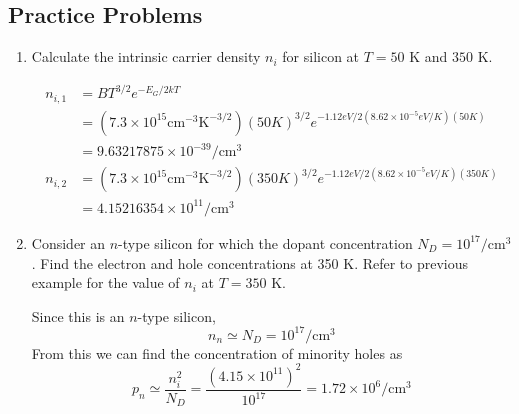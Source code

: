 \subsection{Practice Problems}
    \begin{enumerate}
        \item Calculate the intrinsic carrier density $n_i$ for silicon at $T = 50$ K and $350$ K.
        \begin{Ans}
            \begin{align*}
                n_{i,1} &= BT^{3/2} e^{-E_G / 2kT} \\
                &= (7.3 \times 10^{15} \text{cm}^{-3} \text{K}^{-3/2})(50 K)^{3/2} e^{-1.12 eV / 2(8.62 \times 10^{-5} eV/K)(50 K)} \\
                &= 9.63217875 \times 10^{-39} / \text{cm}^3 \\
                n_{i,2} &= (7.3 \times 10^{15} \text{cm}^{-3} \text{K}^{-3/2})(350 K)^{3/2} e^{-1.12 eV / 2(8.62 \times 10^{-5} eV/K)(350 K)} \\
                &= 4.15216354 \times 10^{11} / \text{cm}^3
            \end{align*}
        \end{Ans}

        \item Consider an $n$-type silicon for which the dopant concentration $N_D = 10^{17}/\text{cm}^3$. Find the electron and hole concentrations at 350 K. Refer to previous example for the value of $n_i$ at $T = 350$ K.
        \begin{Ans}
            Since this is an $n$-type silicon, 
                \[n_n \simeq N_D = 10^{17} /\text{cm}^3\]
            From this we can find the concentration of minority holes as 
                \[p_n \simeq \frac{n_i^2}{N_D} = \frac{(4.15 \times 10^{11})^2}{10^17} = 1.72 \times 10^6 / \text{cm}^3\]
        \end{Ans}
    \end{enumerate}
